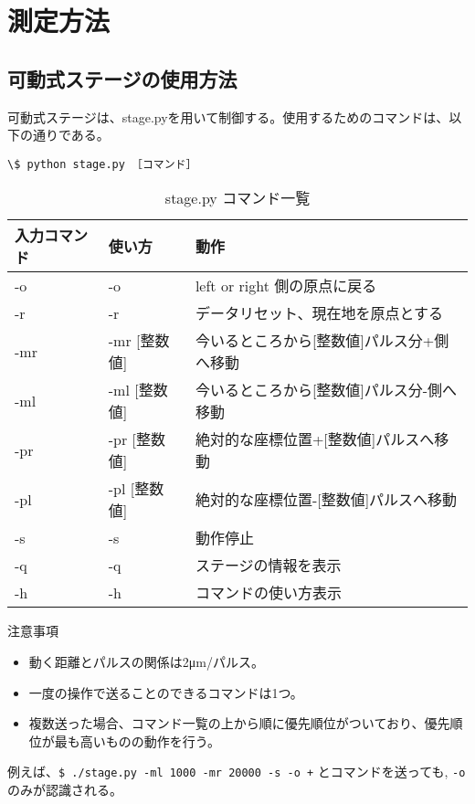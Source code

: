 \documentclass[10pt,a4j]{jarticle}
\begin{document}
\section{測定方法}

\subsection{可動式ステージの使用方法}

可動式ステージは、stage.pyを用いて制御する。使用するためのコマンドは、以下の通りである。
\begin{lstlisting}[caption=stage.pyのコマンド]
\$ python stage.py ［コマンド］  
\end{lstlisting}

\begin{table}[htbp]
  \begin{center}
    \caption{stage.py コマンド一覧}
    \begin{tabular}{|l|l|l|} \hline
      入力コマンド & 使い方 & 動作 \\ \hline \hline
      -o & -o & left or right 側の原点に戻る \\ \hline
      -r & -r & データリセット、現在地を原点とする \\ \hline
      -mr & -mr [整数値] & 今いるところから[整数値]パルス分+側へ移動 \\ \hline
      -ml & -ml [整数値] & 今いるところから[整数値]パルス分-側へ移動 \\ \hline
      -pr & -pr [整数値] & 絶対的な座標位置+[整数値]パルスへ移動 \\ \hline
      -pl & -pl [整数値] & 絶対的な座標位置-[整数値]パルスへ移動 \\ \hline
      -s & -s & 動作停止 \\ \hline
      -q & -q & ステージの情報を表示 \\ \hline
      -h & -h & コマンドの使い方表示 \\ \hline
    \end{tabular}
  \end{center}
\end{table}

\begin{itembox}[l]{注意事項}
  \begin{itemize}
  \item 動く距離とパルスの関係は2μm/パルス。
  \item 一度の操作で送ることのできるコマンドは1つ。 
  \item 複数送った場合、コマンド一覧の上から順に優先順位がついており、優先順位が最も高いものの動作を行う。
  \end{itemize}
  例えば、{\tt \$ ./stage.py -ml 1000 -mr 20000 -s -o +} とコマンドを送っても, {\tt -o} のみが認識される。
\end{itembox}
\end{document}

